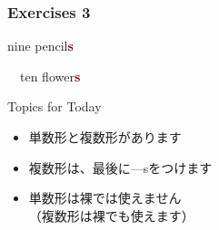\documentclass[aspectratio=169,xcolor={dvipsnames,table}]{beamer}
\newcommand{\myaudio}[1]{\href{#1}{\faVolumeUp}}
\begin{document}
\begin{frame}[plain]\frametitle{Exercises 3}

\hspace{20pt}%
\pause
{}\hspace{15pt}
\pause

\mbox{}\hfill{\large nine pencil\textcolor{Maroon}{\bfseries s}}
\pause

\bigskip

\bigskip


\bcfleur\,\,\,\,\hspace{45pt}%
\pause
\bcfleur\bcfleur\bcfleur\bcfleur\bcfleur\hspace{15pt}
\bcfleur\bcfleur\bcfleur\bcfleur\bcfleur\hspace{10pt}
\pause
\hfill{\large ten flower\textcolor{Maroon}{\bfseries s}}

\hfill\myaudio{./audio/005_singular_plural_03.mp3}

\pause
\begin{exampleblock}{Topics for Today}\small
 \begin{itemize}
  \item 単数形と複数形があります
  \item 複数形は、最後に---sをつけます
  \item 単数形は裸では使えません\,\,\dbend\\
（複数形は裸でも使えます）
 \end{itemize}
     \end{exampleblock}
\end{frame}
\end{document}
